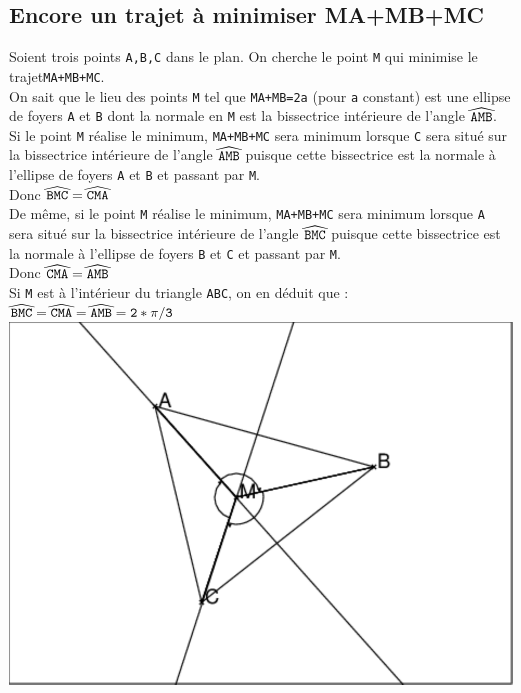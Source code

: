 \documentclass[a4paper,11pt]{book}
\begin{document}
\subsection{Encore un trajet \`a minimiser MA+MB+MC}
Soient trois points {\tt A,B,C} dans le plan. On cherche le point {\tt M} qui 
minimise le trajet{\tt MA+MB+MC}.\\
On sait que le lieu des points {\tt M} tel que  {\tt MA+MB=2a} (pour {\tt a} 
constant) est une ellipse de foyers {\tt A} et {\tt B} dont la normale en 
{\tt M} est la bissectrice int\'erieure de l'angle ${\tt \widehat{AMB}}$.\\
Si le point {\tt M} r\'ealise le minimum, {\tt MA+MB+MC} sera minimum lorsque 
{\tt C} sera situ\'e sur la bissectrice int\'erieure de l'angle 
${\tt \widehat{AMB}}$ puisque cette bissectrice est la normale \`a l'ellipse de
foyers {\tt A} et {\tt B} et passant par {\tt M}.\\
Donc ${\tt \widehat{BMC}=\widehat{CMA}}$\\ 
De m\^eme, si le point {\tt M} r\'ealise le minimum, {\tt MA+MB+MC} sera 
minimum lorsque {\tt A} sera situ\'e sur la bissectrice int\'erieure de l'angle 
${\tt \widehat{BMC}}$ puisque cette bissectrice est la normale \`a l'ellipse de
foyers {\tt B} et {\tt C} et passant par {\tt M}.\\
Donc ${\tt \widehat{CMA}=\widehat{AMB}}$\\
Si {\tt M} est \`a l'int\'erieur du triangle {\tt ABC}, on en d\'eduit que :\\
${\tt \widehat{BMC}=\widehat{CMA}=\widehat{AMB}=2*\pi/3}$\\ 
\includegraphics[width=\textwidth]{mabc1}\\
\end{document}
